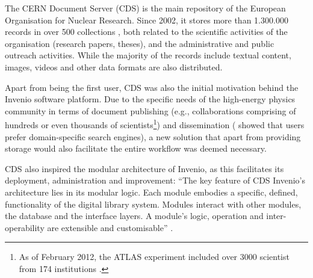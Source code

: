 
The CERN Document Server (CDS) is the main repository of the European
Organisation for Nuclear Research. Since 2002, it stores more than 1.300.000
records \cite{ref:cds} in over 500 collections \cite{ref:ludmilathesis}, both
related to the scientific activities of the organisation (research papers,
theses), and the administrative and public outreach activities. While the
majority of the records include textual content, images, videos and other data
formats are also distributed.

Apart from being the first user, CDS was also the initial motivation behind the
Invenio software platform. Due to the specific needs of the high-energy physics
community in terms of document publishing (e.g., collaborations comprising of
hundreds or even thousands of scientists\footnote{As of February 2012, the
ATLAS experiment included over 3000 scientist from 174 institutions
\cite{ref:atlas}.}) and dissemination (\cite{ref:annette} showed that users
prefer domain-specific search engines), a new solution that apart from
providing storage would also facilitate the entire workflow was deemed
necessary.

CDS also inspired the modular architecture of Invenio, as this facilitates its
deployment, administration and improvement: ``The key feature of CDS Invenio's
architecture lies in its modular logic. Each module embodies a specific,
defined, functionality of the digital library system. Modules interact with
other modules, the database and the interface layers. A module's logic,
operation and inter-operability are extensible and
customisable'' \cite{ref:lemeur}.
